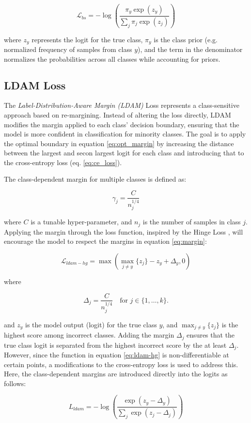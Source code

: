 \begin{equation}
    \mathcal{L}_{bs} = - \log\left( \frac{\pi_y \exp(z_y)}{\sum_j \pi_j \exp(z_j)} \right)
\end{equation}

where $z_y$ represents the logit for the true class, $\pi_y$ is the class prior (e.g. normalized frequency of samples from class $y$), and the term in the denominator normalizes the probabilities across all classes while accounting for priors.




\subsection{LDAM Loss}
\label{sec:ldam_loss}
The \emph{Label-Distribution-Aware Margin (LDAM)} Loss \cite{cao2019learningimbalanceddatasetslabeldistributionaware} represents a class-sensitive approach based on re-margining. Instead of altering the loss directly, LDAM modifies the margin applied to each class’ decision boundary, ensuring that the model is more confident in classification for minority classes. The goal is to apply the optimal boundary in equation \eqref{eq:opt_margin} by increasing the distance between the largest and secon largest logit for each class and introducing that to the cross-entropy loss (eq. \eqref{eq:ce_loss}).


The class-dependent margin for multiple classes is defined as:

\begin{equation}
    \label{eq:margin}
    \gamma_j = \frac{C}{n^{1/4}_j}
\end{equation}

where $C$ is a tunable hyper-parameter, and $n_j$ is the number of samples in class $j$. Applying the margin through the loss function, inspired by the Hinge Loss , will encourage the model to respect the margins in equation \eqref{eq:margin}:

\begin{equation}
    \label{eq:ldam-hg}
    \mathcal{L}_{ldam-hg} = \max\left(\max_{j \neq y}\{z_j\} - z_y + \Delta_y, 0\right)
\end{equation}

where

\begin{equation}
    \Delta_j = \frac{C}{n_j^{1/4}} \quad \text{for } j \in \{1, \dots, k\}.
\end{equation}

and $z_y$ is the model output (logit) for the true class $y$, and $\max_{j \neq y}\{z_j\}$ is the highest score among incorrect classes. Adding the margin $\Delta_j$ ensures that the true class logit is separated from the highest incorrect score by the at least $\Delta_j$. However, since the function in equation \eqref{eq:ldam-hg} is non-differentiable at certain points, a modifications to the cross-entropy loss is used to address this. Here, the class-dependent margins are introduced directly into the logits as follows:

\begin{equation}
    \label{eq:ldam}
    L_{ldam} = - \log\left( \frac{\exp(z_y - \Delta_y)}{\sum_j \exp(z_j - \Delta_j)} \right)
\end{equation}